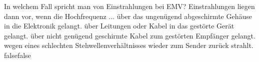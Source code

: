     {In welchem Fall spricht man von Einstrahlungen bei EMV? Einstrahlungen liegen dann vor, wenn die Hochfrequenz ...}
    {über das ungenügend abgeschirmte Gehäuse in die Elektronik gelangt.}
    {über Leitungen oder Kabel in das gestörte Gerät gelangt.}
    {über nicht genügend geschirmte Kabel zum gestörten Empfänger gelangt.}
    {wegen eines schlechten Stehwellenverhältnisses wieder zum Sender zurück strahlt.}
    {false}{false}